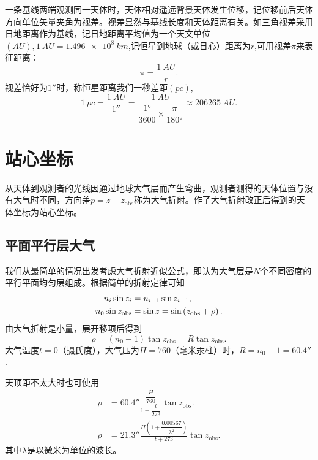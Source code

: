 \documentclass[11pt, a4paper, oneside]{ctexart}
\numberwithin{equation}{subsection}
\begin{document}
一条基线两端观测同一天体时，天体相对遥远背景天体发生位移，记位移前后天体方向单位矢量夹角为视差。视差显然与基线长度和天体距离有关。如三角视差采用日地距离作为基线，记日地距离平均值为一个天文单位$(\unit{AU}),\qty{1}{AU}=\qty{1.496e8}{km}$,记恒星到地球（或日心）距离为$r$,可用视差$\pi$来表征距离：
\begin{equation}
\pi=\frac{\qty{1}{AU}}{r}.
\end{equation}
视差恰好为$\ang{;;1}$时，称恒星距离我们一秒差距$(\unit{pc})$,
\begin{equation}
\qty{1}{pc}=\frac{\qty{1}{AU}}{\ang{;;1}}=\frac{\qty{1}{AU}}{\dfrac{\ang{1;;}}{3600}\times\dfrac{\pi}{\ang{180;;}}}\approx\qty{206265}{AU}.
\end{equation}

\newpage
\section{站心坐标}
从天体到观测者的光线因通过地球大气层而产生弯曲，观测者测得的天体位置与没有大气时不同，方向差$p=z-z_{\text{obs}}$称为大气折射。作了大气折射改正后得到的天体坐标为站心坐标。

\subsection{平面平行层大气}
我们从最简单的情况出发考虑大气折射近似公式，即认为大气层是$N$个不同密度的平行平面均匀层组成。根据简单的折射定律可知
\begin{align}
n_i\sin z_i&=n_{i-1}\sin z_{i-1},\notag\\
n_0\sin z_{\text{obs}}&=\sin z=\sin\left(z_{\text{obs}}+\rho\right).\notag
\end{align}
由大气折射是小量，展开移项后得到
\begin{equation}
\rho=\left(n_0-1\right)\tan z_{\text{obs}}=R\tan z_{\text{obs}}.
\end{equation}
大气温度$t=0$（摄氏度），大气压为$H=760$（毫米汞柱）时，$R=n_{0}-1=\ang{;;60.4}$.

天顶距不太大时也可使用
\begin{align}
\rho&=\ang{;;60.4}\frac{\dfrac{H}{760}}{1+\dfrac{t}{273}}\tan z_{\text{obs}}.\\
\rho&=\ang{;;21.3}\frac{H\left(1+\dfrac{0.00567}{\lambda^2}\right)}{t+273}\tan z_{\text{obs}}.
\end{align}
其中$\lambda$是以微米为单位的波长。
\end{document}
